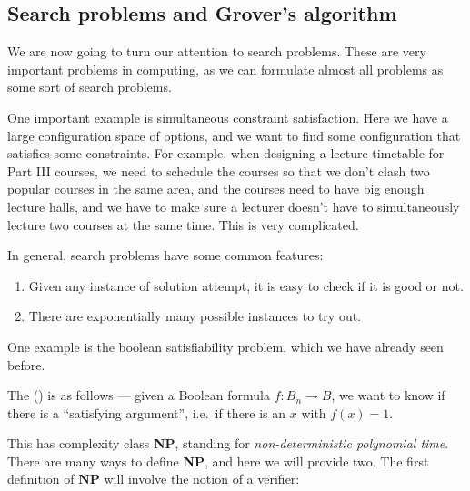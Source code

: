 \subsection{Search problems and Grover's algorithm}
We are now going to turn our attention to search problems. These are very important problems in computing, as we can formulate almost all problems as some sort of search problems.

One important example is simultaneous constraint satisfaction. Here we have a large configuration space of options, and we want to find some configuration that satisfies some constraints. For example, when designing a lecture timetable for Part III courses, we need to schedule the courses so that we don't clash two popular courses in the same area, and the courses need to have big enough lecture halls, and we have to make sure a lecturer doesn't have to simultaneously lecture two courses at the same time. This is very complicated.

In general, search problems have some common features:
\begin{enumerate}
  \item Given any instance of solution attempt, it is easy to check if it is good or not.
  \item There are exponentially many possible instances to try out.
\end{enumerate}

One example is the boolean satisfiability problem, which we have already seen before.
\begin{eg}
  The  () is as follows --- given a Boolean formula $f: B_n \to B$, we want to know if there is a ``satisfying argument'', i.e.\ if there is an $x$ with $f(x) = 1$.
\end{eg}

This has complexity class \textbf{NP}, standing for \emph{non-deterministic polynomial time}. There are many ways to define \textbf{NP}, and here we will provide two. The first definition of \textbf{NP} will involve the notion of a verifier:

